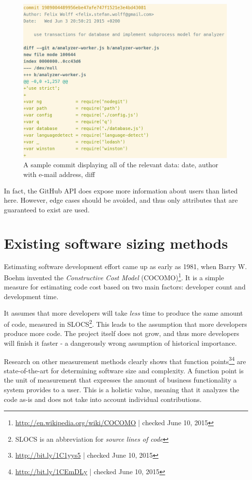 \begin{figure}
    \includegraphics[width=30em]{gfx/commit.png}
    \caption{A sample commit displaying all of the relevant data: date, author with e-mail address, diff}
    \label{fig:commit}
\end{figure}

In fact, the GitHub API does expose more information about users than listed here. However, edge cases should be avoided, and thus only attributes that are guaranteed to exist are used.

\section{Existing software sizing methods}
Estimating software development effort came up as early as 1981, when Barry W. Boehm invented the \textit{Constructive Cost Model} (COCOMO)\footnote{\url{http://en.wikipedia.org/wiki/COCOMO} | checked June 10, 2015}.
It is a simple measure for estimating code cost based on two main factors: developer count and development time.
\newline

It assumes that more developers will take \textit{less} time to produce the same amount of code, measured in SLOCS\footnote{SLOCS is an abbreviation for \textit{source lines of code}}. This leads to the assumption that more developers produce more code. The project itself does not grow, and thus more developers will finish it faster - a dangerously wrong assumption of historical importance\cite{fb:1975}.
\newline

Research on other measurement methods clearly shows that function points\footnote{\url{http://bit.ly/1C1yys5} | checked June 10, 2015}\footnote{\url{http://bit.ly/1CEmDLy} | checked June 10, 2015} are state-of-the-art for determining software size and complexity\cite{linkedin:functionpointstandard}.
A function point is the unit of measurement that expresses the amount of business functionality a system provides to a user. This is a holistic value, meaning that it analyzes the code as-is and does not take into account individual contributions.

